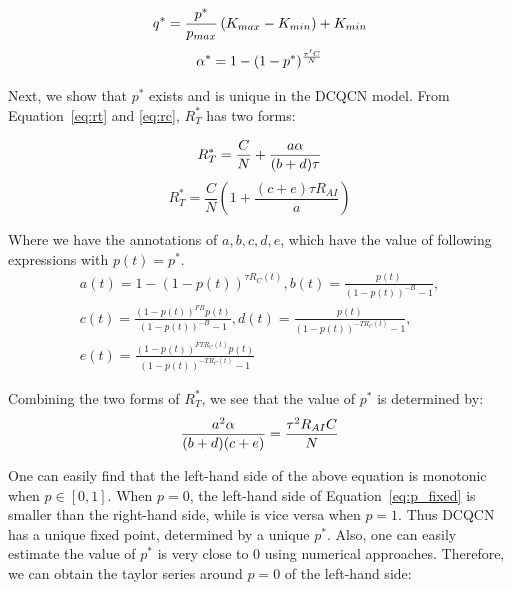 \begin{equation}
\small
{q^*} = \frac{{{p^*}}}{{{p_{max}}}}\left( {{K_{max}} - {K_{min}}} \right) + {K_{min}}
\end{equation}
\begin{equation}
\small
\alpha^*  = 1 - {(1 - p^*)^{\frac{{\tau 'C}}{N}}}
\end{equation}

Next, we show that $p^*$ exists and is unique in the DCQCN model. 
From Equation~\ref{eq:rt} and \ref{eq:rc}, $R_T^*$ has two forms:

\begin{equation}
\small
{R_T^*} = \frac{C}{N} + \frac{{a\alpha }}{{(b + d)\tau }}
\end{equation}
\begin{equation}
{R_T^*} = \frac{C}{N}\left( {1 + \frac{{(c + e)\tau {R_{AI}}}}{a}} \right)
\end{equation}

Where we have the annotations of $a, b, c, d, e$, which have the value of following expressions
with $p(t) = p^*$.
\begin{equation}
\begin{array}{l}
a(t) = 1 - {(1 - p(t))^{\tau {R_C}(t)}},b(t) = \frac{{p(t)}}{{{{(1 - p(t))}^{ - B}} - 1}},\\
c(t) = \frac{{{{(1 - p(t))}^{FB}}p(t)}}{{{{(1 - p(t))}^{ - B}} - 1}},d(t) = \frac{{p(t)}}{{{{(1 - p(t))}^{ - T{R_C}(t)}} - 1}},\\
e(t) = \frac{{{{(1 - p(t))}^{FT{R_C}(t)}}p(t)}}{{{{(1 - p(t))}^{ - T{R_C}(t)}} - 1}}
\end{array}
\end{equation}

Combining the two forms of $R_T^*$, we see that the value of $p^*$ is determined by:
\begin{equation}
\small
\frac{{{a^2}\alpha }}{{(b + d)(c + e)}} = \frac{{{\tau ^2}{R_{AI}}C}}{N}
\label{eq:p_fixed}
\end{equation}

One can easily find that the left-hand side of the above equation is monotonic when $p \in [0,1]$.
When $p = 0$, the left-hand side of Equation~\ref{eq:p_fixed} is smaller than the right-hand side,
while is vice versa when $p = 1$. Thus DCQCN has a unique fixed point, determined by a unique $p^*$. 
Also, one can easily estimate the value of $p^*$ is very 
close to 0 using numerical approaches. Therefore, we can obtain the taylor series around $p=0$ of the left-hand side:

